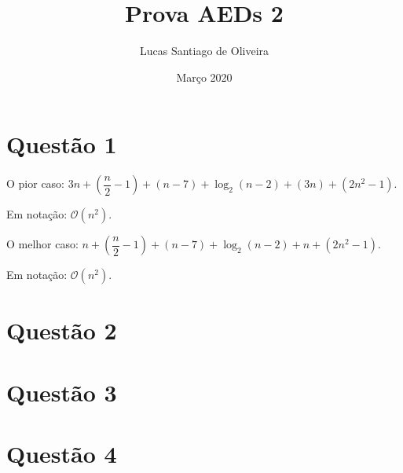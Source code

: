 \documentclass{article}
\title{Prova AEDs 2}
\author{Lucas Santiago de Oliveira}
\date{Março 2020}
\begin{document}
\maketitle

\section{Questão 1}
\begin{description}
\hspace{10mm} O pior caso: $3n + (\dfrac{n}{2}-1) + (n-7) + \log_2(n-2) + (3n) + (2n^2-1)$.

\hspace{10mm} Em notação: $\mathcal{O}(n^2)$.
\end{description}

\begin{description}
\hspace{10mm} O melhor caso: $n + (\dfrac{n}{2}-1) + (n-7) + \log_2(n-2) + n + (2n^2-1)$.

\hspace{10mm} Em notação: $\mathcal{O}(n^2)$.
\end{description}
\vspace{10mm}
\section{Questão 2}


\vspace{10mm}


\section{Questão 3}


\vspace{10mm}

\section{Questão 4}


\vspace{10mm}
\end{document}

